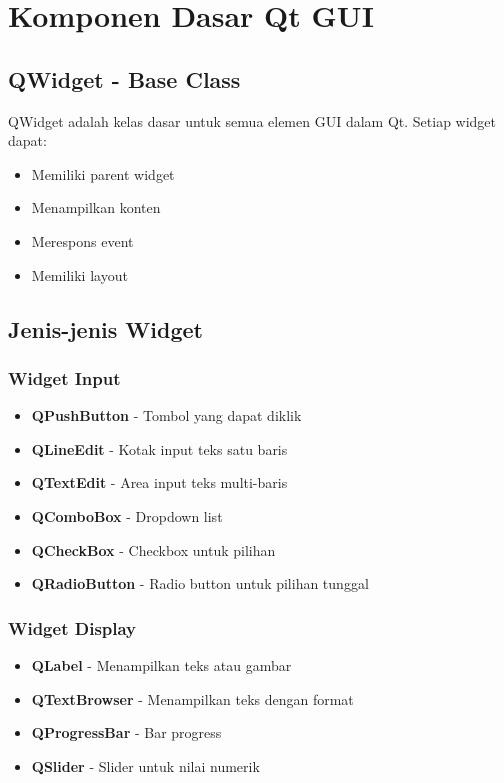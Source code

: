 \section{Komponen Dasar Qt GUI}

\subsection{QWidget - Base Class}

QWidget adalah kelas dasar untuk semua elemen GUI dalam Qt. Setiap widget dapat:
\begin{itemize}
\item Memiliki parent widget
\item Menampilkan konten
\item Merespons event
\item Memiliki layout
\end{itemize}

\subsection{Jenis-jenis Widget}

\subsubsection{Widget Input}
\begin{itemize}
\item \textbf{QPushButton} - Tombol yang dapat diklik
\item \textbf{QLineEdit} - Kotak input teks satu baris
\item \textbf{QTextEdit} - Area input teks multi-baris
\item \textbf{QComboBox} - Dropdown list
\item \textbf{QCheckBox} - Checkbox untuk pilihan
\item \textbf{QRadioButton} - Radio button untuk pilihan tunggal
\end{itemize}

\subsubsection{Widget Display}
\begin{itemize}
\item \textbf{QLabel} - Menampilkan teks atau gambar
\item \textbf{QTextBrowser} - Menampilkan teks dengan format
\item \textbf{QProgressBar} - Bar progress
\item \textbf{QSlider} - Slider untuk nilai numerik
\end{itemize}

